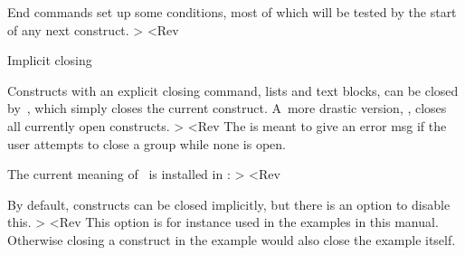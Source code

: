 End commands set up some conditions, most of which will be tested
by the start of any next construct.
\Ver>
\def\inner@end@commands{%
    \nxp\Close@Group\CSname{\@class}\CSname{\@name}%
    \ifright@embedded@construct \else \nxp\leavehmode \fi
    \@afterpenalty
    \ifright@embedded@construct \else \nxp\@vwhite{\the\@whiteafter}\fi
    }
\def\outer@end@commands{%
    \the\after@toks
    \ifright@embedded@construct 
        \nxp\@headedno \nxp\esp@hack
    \else
        \after@indent \nxp\dono@parskip
    \fi}<Rev

 Implicit closing

Constructs with an explicit closing command, lists and text blocks,
can be closed by~\cs{>}, which simply closes the current
construct. A~more drastic version, \cs{>]}, closes all currently
open constructs.
\Ver>
\def\outer@stop@command{\Emessage{Vacuous group closing}}
\let\default@stop@command\outer@stop@command
\def\>{\default@stop@command%
    \ifNextChar]{%
        \ifx\default@stop@command\outer@stop@command
            \xp\take@one
        \else \xp\>\fi}{}}<Rev
The  is meant to give an error msg if the
user attempts to close a group while none is open.

The current meaning of~\cs{>} is installed in
:
\Ver>
\def\install@stop{\if@implicitclose
        \def\nxp\default@stop@command
               {\CSname{\stop@command}}%
    \else \let\nxp\default@stop@command
              \nxp\outer@stop@command 
    \fi}<Rev

By default, constructs can be closed implicitly, but there is an
option  to disable this.
\Ver>
\newif\if@implicitclose
\add@generic@default{\@implicitcloseyes}
<Rev
This option is for instance used in the examples in this manual.
Otherwise closing a construct in the example would also close the
example itself.

\ImpNoteStop
